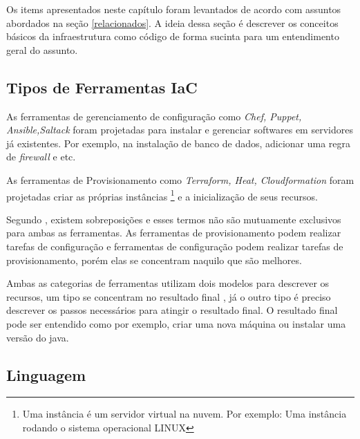 Os items apresentados neste capítulo foram levantados de acordo com assuntos abordados na seção \ref{relacionados}. A ideia dessa seção é descrever os conceitos básicos da infraestrutura como código de forma sucinta para um entendimento geral do assunto.  

\subsection{Tipos de Ferramentas IaC}
As ferramentas de gerenciamento de configuração como \textit{Chef, Puppet, Ansible,Saltack} foram projetadas para instalar e gerenciar softwares em servidores já existentes. Por exemplo, na instalação de banco de dados, adicionar uma regra de \textit{firewall} e etc.

As ferramentas de Provisionamento como \textit{Terraform, Heat, Cloudformation} foram projetadas criar as próprias instâncias \footnote{Uma instância é um servidor virtual na nuvem. Por exemplo: Uma instância rodando o sistema operacional LINUX} e a inicialização de seus recursos. 

Segundo , existem sobreposições e esses termos não são mutuamente exclusivos para ambas as ferramentas. As ferramentas de provisionamento podem realizar tarefas de configuração e ferramentas de configuração podem realizar tarefas de provisionamento, porém elas se concentram naquilo que são melhores. 

Ambas as categorias de ferramentas utilizam dois modelos para descrever os recursos, um tipo se concentram no resultado final , já o outro tipo é preciso descrever os passos necessários para atingir o resultado final. O resultado final pode ser entendido como por exemplo, criar uma nova máquina ou instalar uma versão do java. 

\subsection{Linguagem}

